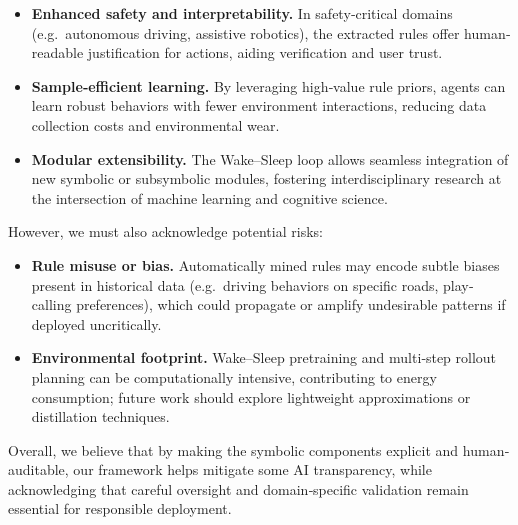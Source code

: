 \documentclass{article} %
\begin{document}
\begin{itemize}
  \item \textbf{Enhanced safety and interpretability.}  In safety‐critical domains (e.g.\ autonomous driving, assistive robotics), the extracted rules offer human‐readable justification for actions, aiding verification and user trust.
  \item \textbf{Sample‐efficient learning.}  By leveraging high‐value rule priors, agents can learn robust behaviors with fewer environment interactions, reducing data collection costs and environmental wear.
  \item \textbf{Modular extensibility.}  The Wake–Sleep loop allows seamless integration of new symbolic or subsymbolic modules, fostering interdisciplinary research at the intersection of machine learning and cognitive science.
\end{itemize}

However, we must also acknowledge potential risks:

\begin{itemize}
  \item \textbf{Rule misuse or bias.}  Automatically mined rules may encode subtle biases present in historical data (e.g.\ driving behaviors on specific roads, play‐calling preferences), which could propagate or amplify undesirable patterns if deployed uncritically.
  \item \textbf{Environmental footprint.}  Wake–Sleep pretraining and multi‐step rollout planning can be computationally intensive, contributing to energy consumption; future work should explore lightweight approximations or distillation techniques.
\end{itemize}

Overall, we believe that by making the symbolic components explicit and human‐auditable, our framework helps mitigate some AI transparency, while acknowledging that careful oversight and domain‐specific validation remain essential for responsible deployment.  
\fi
\end{document}
